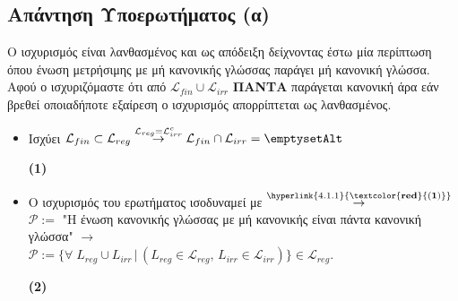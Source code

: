 \subsection{Απάντηση Υποερωτήματος (α)}
\label{ssec:Solution_4.1}
\doublespacing

\reducevspace\reducevspace\reducevspace\reducevspace\reducevspace\reducevspace\reducevspace
Ο ισχυρισμός είναι λανθασμένος και ως απόδειξη δείχνοντας έστω μία περίπτωση όπου ένωση μετρήσιμης με μή κανονικής
γλώσσας παράγει μή κανονική γλώσσα. Αφού ο ισχυριζόμαστε ότι από $\mathcal{L}_{fin} \cup \mathcal{L}_{irr}$
\textbf{ΠΑΝΤΑ} παράγεται κανονική άρα εάν βρεθεί
οποιαδήποτε εξαίρεση ο ισχυρισμός απορρίπτεται ως λανθασμένος.

\begin{tcolorbox}[colback=yellow!15!white, colframe=blue!50!white,
	fonttitle=\bfseries\Large, title = Απόδειξη - μέρος 1/3]
	\begin{itemize}
		\itemsep1em

		\item Ισχύει $\mathcal{L}_{fin} \subset \mathcal{L}_{reg} \overset{\mathcal{L}_{reg} =
	 	\mathcal{L}_{irr}^c}{\rightarrow} \mathcal{L}_{fin} \cap \mathcal{L}_{irr} = \emptysetAlt$
	 	\reducevspace\reducevspace\reducevspace\reducevspace\reducevspace\reducevspace\reducevspace
	 	\reducevspace\reducevspace\reducevspace\reducevspace\reducevspace\reducevspace\reducevspace
	 	\reducevspace\reducevspace\reducevspace\reducevspace\reducevspace\reducevspace\reducevspace
		\begin{flushright}\hypertarget{4.1.1}{\bf{(1)}}\end{flushright}

		\item Ο ισχυρισμός του ερωτήματος ισοδυναμεί με
		$\overset{\hyperlink{4.1.1}{\bf{\textcolor{red}{(1)}}}}{\rightarrow}$ $\mathcal{P} := $ "Η ένωση
		κανονικής γλώσσας
		με μή κανονικής είναι πάντα κανονική γλώσσα" $\rightarrow$\\ $\mathcal{P} :=
		\{\forall\; L_{reg} \cup L_{irr} \,\vert\,
		(L_{reg} \in \mathcal{L}_{reg},\, L_{irr} \in \mathcal{L}_{irr})\}\in \mathcal{L}_{reg}$.
		\reducevspace\reducevspace\reducevspace\reducevspace\reducevspace\reducevspace\reducevspace
		\reducevspace\reducevspace\reducevspace\reducevspace\reducevspace\reducevspace\reducevspace
		\reducevspace\reducevspace\reducevspace\reducevspace\reducevspace\reducevspace\reducevspace
		\begin{flushright}\hypertarget{4.1.2}{\bf{(2)}}\end{flushright}


\end{itemize}
\end{tcolorbox}
